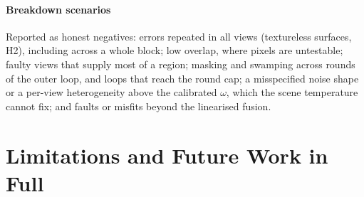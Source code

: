 \paragraph{Breakdown scenarios} Reported as honest negatives: errors repeated in all views
(textureless surfaces, H2), including across a whole block; low overlap, where pixels are untestable; faulty views that supply most of a
region; masking and swamping across rounds of the outer loop, and loops that reach
the round cap; a misspecified noise shape or a per-view heterogeneity above the calibrated $\omega$, which the
scene temperature cannot fix; and faults or misfits beyond the linearised fusion.

\section{Limitations and Future Work in Full}
\label{sup:limits}
